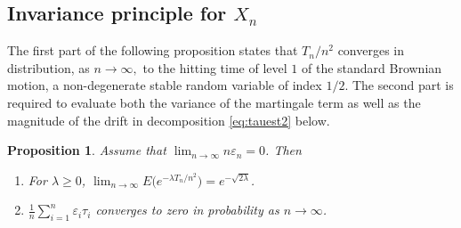 \documentclass[12pt]{amsart}
\newtheorem{proposition}[theorem]{Proposition}
\begin{document}
\subsection{Invariance principle for $X_n$}
\label{part1} The first part of the following proposition states
that $T_n/n^2$ converges in distribution, as $n\to\infty,$ to the
hitting time of level $1$ of the standard Brownian motion, a
non-degenerate stable random variable of index $1/2$. The second
part is required to evaluate both the variance of the martingale
term as well as the magnitude of the drift in decomposition
\eqref{eq:tauest2} below.
\begin{proposition}
\label{supera} Assume that $\lim_{n\to\infty} n {\varepsilon}_n =0$. Then
\begin{enumerate}
\item For $\lambda \ge 0$, $\lim_{n\to\infty} E\bigl(e^{-\lambda
T_n/n^2}\bigr)=e^{-\sqrt{2\lambda}}$.
\item ${\frac {\displaystyle {1}}{\displaystyle {n} }}\sum_{i=1}^n {\varepsilon}_i \tau_i$
converges to zero in probability as $n\to\infty$.
\end{enumerate}
\end{proposition}
\end{document}
